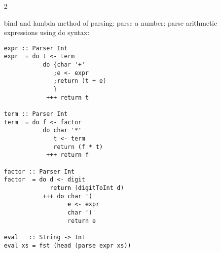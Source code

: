 \documentclass{article}
\def \columncount {2}
\begin{document}
\begin{multicols*}{\columncount}
\begin{outline}[longenum]
  \1 bind and lambda method of parsing:
    \2 parse a number:
  \1 parse arithmetic expressions using do syntax:
\vspace{-0.2cm}\begin{lstlisting}
expr :: Parser Int
expr  = do t <- term
           do {char '+'
              ;e <- expr
              ;return (t + e)
              }
            +++ return t

term :: Parser Int
term  = do f <- factor
           do char '*'
              t <- term
              return (f * t)
            +++ return f

factor :: Parser Int
factor  = do d <- digit
             return (digitToInt d)
           +++ do char '('
                  e <- expr
                  char ')'
                  return e

eval   :: String -> Int
eval xs = fst (head (parse expr xs))
\end{lstlisting} \vspace{-0.2cm}


\end{outline}
\end{multicols*}
\end{document}
